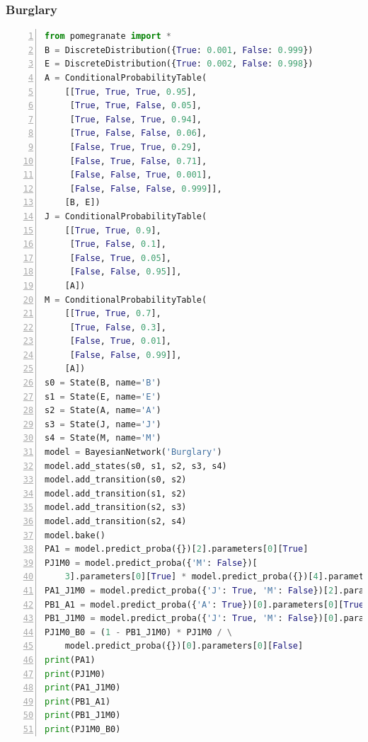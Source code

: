 \documentclass[a4paper, 11pt]{article}
\begin{document}
\subsubsection{Burglary}
\begin{lstlisting}[title=burglary.py,language=python,numbers=left]
from pomegranate import *
B = DiscreteDistribution({True: 0.001, False: 0.999})
E = DiscreteDistribution({True: 0.002, False: 0.998})
A = ConditionalProbabilityTable(
    [[True, True, True, 0.95],
     [True, True, False, 0.05],
     [True, False, True, 0.94],
     [True, False, False, 0.06],
     [False, True, True, 0.29],
     [False, True, False, 0.71],
     [False, False, True, 0.001],
     [False, False, False, 0.999]],
    [B, E])
J = ConditionalProbabilityTable(
    [[True, True, 0.9],
     [True, False, 0.1],
     [False, True, 0.05],
     [False, False, 0.95]],
    [A])
M = ConditionalProbabilityTable(
    [[True, True, 0.7],
     [True, False, 0.3],
     [False, True, 0.01],
     [False, False, 0.99]],
    [A])
s0 = State(B, name='B')
s1 = State(E, name='E')
s2 = State(A, name='A')
s3 = State(J, name='J')
s4 = State(M, name='M')
model = BayesianNetwork('Burglary')
model.add_states(s0, s1, s2, s3, s4)
model.add_transition(s0, s2)
model.add_transition(s1, s2)
model.add_transition(s2, s3)
model.add_transition(s2, s4)
model.bake()
PA1 = model.predict_proba({})[2].parameters[0][True]
PJ1M0 = model.predict_proba({'M': False})[
    3].parameters[0][True] * model.predict_proba({})[4].parameters[0][False]
PA1_J1M0 = model.predict_proba({'J': True, 'M': False})[2].parameters[0][True]
PB1_A1 = model.predict_proba({'A': True})[0].parameters[0][True]
PB1_J1M0 = model.predict_proba({'J': True, 'M': False})[0].parameters[0][True]
PJ1M0_B0 = (1 - PB1_J1M0) * PJ1M0 / \
    model.predict_proba({})[0].parameters[0][False]
print(PA1)
print(PJ1M0)
print(PA1_J1M0)
print(PB1_A1)
print(PB1_J1M0)
print(PJ1M0_B0)
\end{lstlisting}
\end{document}
